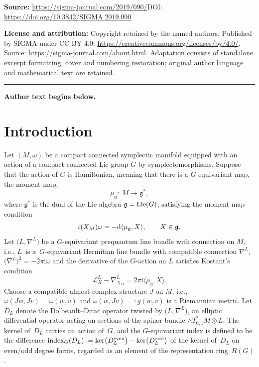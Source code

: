 \documentclass[11pt]{article}
\numberwithin{equation}{section}
\newcommand{\pair}[2]{\langle #1, #2 \rangle}
\newcommand{\tn}[1]{\textnormal{#1}}
\renewcommand{\i}{{\mathrm{i}}}
\def\g{\ensuremath{\mathfrak{g}}}
\def\L{\ensuremath{\mathcal{L}}}
\def\ker{\ensuremath{\textnormal{ker}}}
\def\index{\ensuremath{\textnormal{index}}}
\begin{document}
\noindent\textbf{Source:} \url{https://sigma-journal.com/2019/090/}\quad DOI: \url{https://doi.org/10.3842/SIGMA.2019.090}\par
\noindent\textbf{License and attribution:} Copyright retained by the named authors. Published by SIGMA under CC BY 4.0: \url{https://creativecommons.org/licenses/by/4.0/}. Source: \url{https://sigma-journal.com/about.html}. Adaptation consists of standalone excerpt formatting, cover and numbering restoration; original author language and mathematical text are retained.\par
\medskip\hrule\medskip\noindent\textbf{Author text begins below.}\par
\setcounter{section}{0}
\setcounter{subsection}{0}
\setcounter{subsubsection}{0}
\setcounter{Theorem}{0}
\setcounter{equation}{0}
\section{Introduction}
Let $(M,\omega)$ be a compact connected symplectic manifold equipped with an action of a compact connected Lie group $G$ by symplectomorphisms. Suppose that the action of $G$ is Hamiltonian, meaning that there is a $G$-equivariant map, the moment map,
\[ \mu_\g \colon \ M \rightarrow \g^\ast,\]
where $\g^\ast$ is the dual of the Lie algebra $\g=\tn{Lie}(G)$, satisfying the moment map condition
\begin{gather}\label{eqn:mm}
\iota(X_M)\omega=-{\rm d}\pair{\mu_\g}{X}, \qquad X \in \g.
\end{gather}
Let $\big(L,\nabla^L\big)$ be a $G$-equivariant prequantum line bundle with connection on $M$, i.e., $L$~is a~$G$-equivariant Hermitian line bundle with compatible connection $\nabla^L$, $\big(\nabla^L\big)^2=-2\pi \i \omega$ and the derivative of the $G$-action on $L$ satisfies Kostant's condition
\[ \L^L_X-\nabla^L_{X_M}=2\pi \i\pair{\mu_\g}{X}.\]
Choose a compatible almost complex structure $J$ on $M$, i.e., $\omega(Jw,Jv)=\omega(w,v)$ and $\omega(w,Jv)\allowbreak =:g(w,v)$ is a Riemannian metric. Let $D_L$ denote the Dolbeault--Dirac operator twisted by $\big(L,\nabla^L\big)$, an elliptic differential operator acting on sections of the spinor bundle $\wedge T^\ast_{0,1}M\otimes L$. The kernel of~$D_L$ carries an action of~$G$, and the $G$-equivariant index is defined to be the difference $\index_G(D_L):=\ker\big(D_L^{\tn{even}}\big)-\ker\big(D_L^{\tn{odd}}\big)$ of the kernel of~$D_L$ on even/odd degree forms, regarded as an element of the representation ring~$R(G)$.
\end{document}
